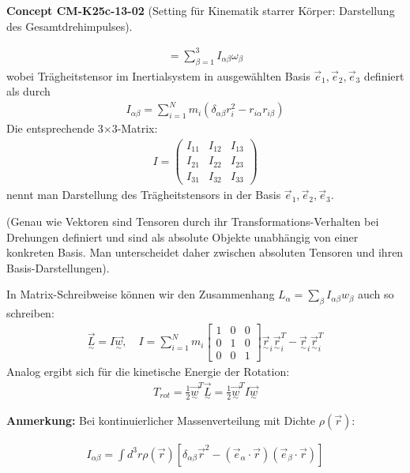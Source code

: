 \documentclass[10pt, letterpaper]{article}
\newcommand{\CustomHeading}[3]{%
  \par\medskip\noindent%
  \textbf{#1 #2} \textnormal{(#3)}.\enskip%
}
\newenvironment{CONC}[2]{\begin{unitbox}\CustomHeading{Concept}{#1}{#2}}{\end{unitbox}}
\begin{document}
\begin{CONC}{CM-K25c-13-02}{Setting für Kinematik starrer Körper: Darstellung des Gesamtdrehimpulses}
\[\begin{aligned}
= \sum_{\beta=1}^3 I_{\alpha\beta} \omega_\beta
\end{aligned}
\]
wobei Trägheitstensor im Inertialsystem in ausgewählten Basis $\vec{e}_1, \vec{e}_2, \vec{e}_3$ definiert als durch
$$
\begin{aligned}
I_{\alpha\beta} = \sum_{i=1}^N m_i \left(\delta_{\alpha\beta} r_i^2 - r_{i\alpha} r_{i\beta}\right)
\end{aligned}
$$
Die entsprechende 3$\times$3-Matrix:
$$
\begin{aligned}
I = \begin{pmatrix}
I_{11} & I_{12} & I_{13} \\
I_{21} & I_{22} & I_{23} \\
I_{31} & I_{32} & I_{33}
\end{pmatrix}
\end{aligned}
$$
nennt man Darstellung des Trägheitstensors in der Basis $\vec{e}_1,\vec{e}_2,\vec{e}_3$.

(Genau wie Vektoren sind Tensoren durch ihr Transformations-Verhalten bei Drehungen definiert und sind als absolute Objekte unabhängig von einer konkreten Basis. Man unterscheidet daher zwischen absoluten Tensoren und ihren Basis-Darstellungen).

In Matrix-Schreibweise können wir den Zusammenhang $L_\alpha = \sum_\beta I_{\alpha\beta}w_\beta$ auch so schreiben:
$$
\begin{aligned}
\vec{\underset{\sim}{L}} = I \vec{\underset{\sim}{w}}, \quad I = \sum_{i=1}^N m_i \begin{bmatrix}
1 & 0 & 0 \\
0 & 1 & 0 \\
0 & 0 & 1
\end{bmatrix} \vec{\underset{\sim}{r}}_i \vec{\underset{\sim}{r}}_i^T - \vec{\underset{\sim}{r}}_i \vec{\underset{\sim}{r}}_i^T
\end{aligned}
$$
Analog ergibt sich für die kinetische Energie der Rotation:
$$
\begin{aligned}
T_{rot} = \frac{1}{2} \vec{\underset{\sim}{w}}^T \vec{\underset{\sim}{L}} = \frac{1}{2} \vec{\underset{\sim}{w}}^T I \vec{\underset{\sim}{w}}
\end{aligned}
$$



\textbf{Anmerkung:} Bei kontinuierlicher Massenverteilung mit Dichte $\rho(\vec{r})$:

$$
\begin{aligned}
I_{\alpha\beta} = \int d^3r \rho(\vec{r}) \left[\delta_{\alpha\beta} \vec{r}^2 - (\vec{e}_\alpha \cdot \vec{r})(\vec{e}_\beta \cdot \vec{r})\right]
\end{aligned}
$$
\end{CONC}
\end{document}
